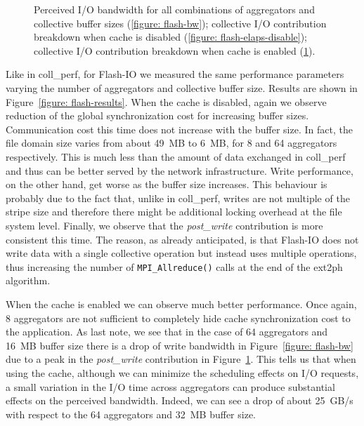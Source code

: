 \begin{figure}[]
\begin{subfigure}[]{\textwidth}
  \caption{}
  \label{figure: flash-elaps-enable}
  \end{subfigure}
  \caption{Perceived I/O bandwidth for all combinations of aggregators and collective buffer sizes (\ref{figure: flash-bw}); collective I/O contribution breakdown 
  when cache is disabled (\ref{figure: flash-elaps-disable}); collective I/O contribution breakdown when cache is enabled (\ref{figure: flash-elaps-enable}).}
  \label{figure: flash-results}
\end{figure}

Like in coll\_perf, for Flash-IO we measured the same performance parameters varying the number of aggregators and collective buffer size. Results are shown in Figure~\ref{figure:
flash-results}. When the cache is disabled, again we observe reduction of the global synchronization cost for increasing buffer sizes. Communication cost this time does not increase 
with the buffer size. In fact, the file domain size varies from about 49~MB to 6~MB, for 8 and 64 aggregators respectively. This is much less than the amount of data exchanged in 
coll\_perf and thus can be better served by the network infrastructure. Write performance, on the other hand, get worse as the buffer size increases. This behaviour is probably due 
to the fact that, unlike in coll\_perf, writes are not multiple of the stripe size and therefore there might be additional locking overhead at the file system level.
Finally, we observe that the \textit{post\_write} contribution is more consistent this time. The reason, as already anticipated, is that Flash-IO does not write data with a single
collective operation but instead uses multiple operations, thus increasing the number of \texttt{MPI\_Allreduce()} calls at the end of the ext2ph algorithm.

When the cache is enabled we can observe much better performance. Once again, 8 aggregators are not sufficient to completely hide cache synchronization cost to the application. As last
note, we see that in the case of 64 aggregators and 16~MB buffer size there is a drop of write bandwidth in Figure~\ref{figure: flash-bw} due to a peak in the \textit{post\_write}
contribution in Figure~\ref{figure: flash-elaps-enable}. This tells us that when using the cache, although we can minimize the scheduling effects on I/O requests, a small variation 
in the I/O time across aggregators can produce substantial effects on the perceived bandwidth. Indeed, we can see a drop of about 25~GB/s with respect to the 64 aggregators and 
32~MB buffer size.

